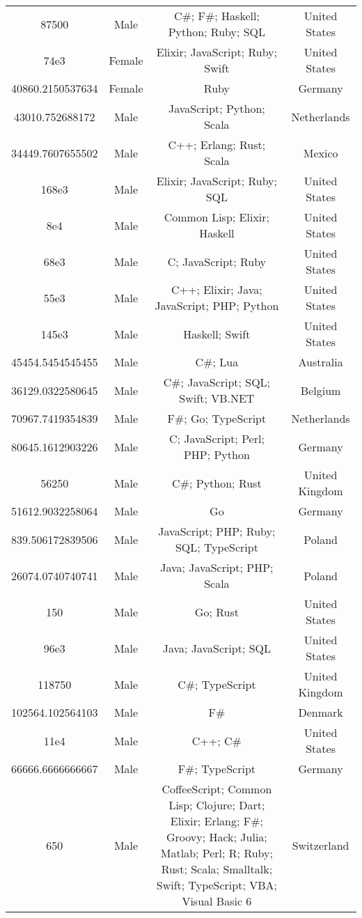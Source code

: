 \begin{center}
\begin{tabular}{ |c|c|c|c| }
87500  &  Male  &  C\#; F\#; Haskell; Python; Ruby; SQL  &  United States  \\ 
74e3  &  Female  &  Elixir; JavaScript; Ruby; Swift  &  United States  \\ 
40860.2150537634  &  Female  &  Ruby  &  Germany  \\ 
43010.752688172  &  Male  &  JavaScript; Python; Scala  &  Netherlands  \\ 
34449.7607655502  &  Male  &  C++; Erlang; Rust; Scala  &  Mexico  \\ 
168e3  &  Male  &  Elixir; JavaScript; Ruby; SQL  &  United States  \\ 
8e4  &  Male  &  Common Lisp; Elixir; Haskell  &  United States  \\ 
68e3  &  Male  &  C; JavaScript; Ruby  &  United States  \\ 
55e3  &  Male  &  C++; Elixir; Java; JavaScript; PHP; Python  &  United States  \\ 
145e3  &  Male  &  Haskell; Swift  &  United States  \\ 
45454.5454545455  &  Male  &  C\#; Lua  &  Australia  \\ 
36129.0322580645  &  Male  &  C\#; JavaScript; SQL; Swift; VB.NET  &  Belgium  \\ 
70967.7419354839  &  Male  &  F\#; Go; TypeScript  &  Netherlands  \\ 
80645.1612903226  &  Male  &  C; JavaScript; Perl; PHP; Python  &  Germany  \\ 
56250  &  Male  &  C\#; Python; Rust  &  United Kingdom  \\ 
51612.9032258064  &  Male  &  Go  &  Germany  \\ 
839.506172839506  &  Male  &  JavaScript; PHP; Ruby; SQL; TypeScript  &  Poland  \\ 
26074.0740740741  &  Male  &  Java; JavaScript; PHP; Scala  &  Poland  \\ 
150  &  Male  &  Go; Rust  &  United States  \\ 
96e3  &  Male  &  Java; JavaScript; SQL  &  United States  \\ 
118750  &  Male  &  C\#; TypeScript  &  United Kingdom  \\ 
102564.102564103  &  Male  &  F\#  &  Denmark  \\ 
11e4  &  Male  &  C++; C\#  &  United States  \\ 
66666.6666666667  &  Male  &  F\#; TypeScript  &  Germany  \\ 
650  &  Male  &  CoffeeScript; Common Lisp; Clojure; Dart; Elixir; Erlang; F\#; Groovy; Hack; Julia; Matlab; Perl; R; Ruby; Rust; Scala; Smalltalk; Swift; TypeScript; VBA; Visual Basic 6  &  Switzerland  \\ 

\end{tabular}
\end{center}
